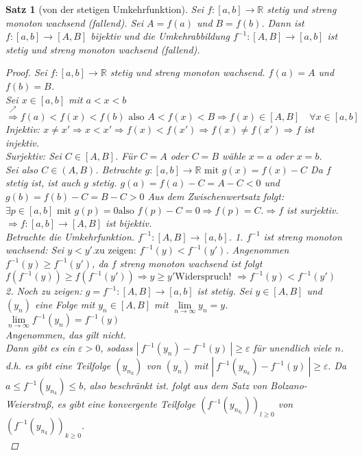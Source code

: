 \documentclass[a4paper,titlepage,oneside]{article}
\def\R{\ensuremath{\mathbb{R}} }
\renewcommand{\epsilon}{\ensuremath{\varepsilon} }
\def\WSP{\text{Widerspruch! }}
\def\zz{\text{zu zeigen: }}
\renewcommand{\liminf}[2][n]{\ensuremath{\lim\limits_{#1 \rightarrow \infty}{#2}}}
\newcommand{\abs}[1]{\ensuremath{\left|\:#1\:\right|}}
\theoremstyle{thmstyle}
\newtheorem{satz}{Satz}[subsection]
\begin{document}
\begin{satz}[von der stetigen Umkehrfunktion]
Sei $f: [a,b] \to \R$ stetig und streng monoton wachsend (fallend). Sei $ A= f(a)$ und $ B = f(b)$.
Dann ist $f: [a,b] \to [A,B]$ bijektiv und die Umkehrabbildung $f^{-1} : [A,B] \to [a,b]$ ist stetig und streng monoton wachsend (fallend).
\begin{proof}
Sei $f: [a,b] \to \R$ stetig und streng monoton wachsend. $f(a) = A$ und $f(b) = B$.\\
Sei $x \in[a,b]$ mit $a < x < b$\\
$\overset{\nearrow}{\Rightarrow} f(a) < f(x) < f(b) \text{ also } A < f(x) < B \Rightarrow f(x) \in [A,B] \quad \forall x \in[a,b]$\\
Injektiv: $x \ne x' \Rightarrow x < x' \Rightarrow f(x) < f(x') \Rightarrow f(x) \ne f(x') \Rightarrow f$ ist injektiv.\\
Surjektiv: Sei $ C \in [A,B]$. Für $C = A $ oder $C = B$ wähle $ x = a$ oder $x = b$.\\
Sei also $C \in (A,B)$. Betrachte $g: [a,b] \to \R \text{ mit } g(x) = f(x)-C$ Da $f$ stetig ist, ist auch $g$ stetig. $g(a) = f(a) -C = A- C < 0$ und $g(b) = f(b) -C = B - C > 0$ Aus dem Zwischenwertsatz folgt: $\exists p \in [a,b]\text{ mit }g(p) = 0\text{also } f(p) - C = 0 \Rightarrow f(p) = C. \Rightarrow f$ ist surjektiv.\\
$\Rightarrow  f: [a,b] \to [A,B] $ ist bijektiv.\\
Betrachte die Umkehrfunktion. $f^{-1} : [A,B] \to [a,b]$.
1. $f^{-1}$  ist streng monoton wachsend:
Sei $y < y'. \zz f^{-1}(y) < f^{-1}(y')$.
Angenommen $f^{-1}(y) \ge f^{-1}(y')$, da $f$ streng monoton wachsend ist folgt $f(f^{-1}(y)) \ge f(f^{-1}(y')) \Rightarrow y \ge y' \WSP \Rightarrow f^{-1}(y) < f^{-1}(y')$\\
2. Noch zu zeigen: $g = f^{-1}: [A,B] \to [a,b]$ ist stetig.
Sei $y \in [A,B]$ und $(y_n)$ eine Folge mit $y_n \in[A,B]$ mit $\liminf{y_n} = y$.\\
\zz $\liminf{f^{-1}(y_n)} = f^{-1}(y)$\\
Angenommen, das gilt nicht.\\
Dann gibt es ein $\epsilon > 0$, sodass $\abs{f^{-1}(y_n) - f^{-1}(y)} \ge \epsilon$ für unendlich viele $n$. d.h. es gibt eine Teilfolge $(y_{n_k})$ von $(y_n)$ mit $\abs{f^{-1}(y_{n_k}) - f^{-1}(y)} \ge \epsilon.$ Da $a \le f^{-1}(y_{n_k}) \le b$, also beschränkt ist. folgt aus dem Satz von Bolzano-Weierstraß, es gibt eine konvergente Teilfolge $(f^{-1}(y_{n_{k_l}}))_{l \ge 0}$ von $(f^{-1}(y_{n_k}))_{k \ge 0}$.\\

\end{proof}
\end{satz}
\end{document}

